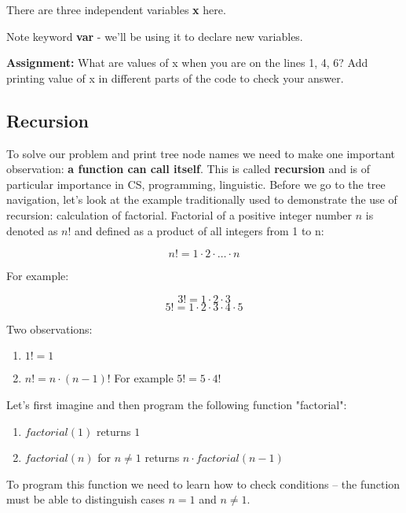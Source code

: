 There are three independent variables \textbf{x} here.

Note keyword \textbf{var} - we'll be using it to declare new variables.

\bigskip
\begin{tcolorbox}
\textbf{Assignment:}
What are values of x when you are on the lines 1, 4, 6?
Add printing value of x in different parts of the code
to check your answer.
\end{tcolorbox}

\subsection{Recursion}

To solve our problem and print tree node names we need
to make one important observation: \textbf{a function can call itself}.
This is called \textbf{recursion} and is of particular importance in
CS, programming, linguistic. Before we go to the tree navigation,
let's look at the example traditionally used to demonstrate
the use of recursion: calculation of factorial. Factorial of a
positive integer number $n$
is denoted as $n!$ and defined as a product of all integers
from 1 to n:

$$n! = 1 \cdot 2 \cdot\dots\cdot n$$

For example:

$$3! = 1\cdot 2\cdot 3$$
$$5! = 1\cdot 2\cdot 3\cdot 4\cdot 5$$

Two observations:

\begin{leftborder}
\begin{enumerate}
\item $1! = 1$
\item $n! = n\cdot (n-1)!$ For example $5! = 5\cdot 4!$
\end{enumerate}
\end{leftborder}

Let's first imagine and then program the following function "factorial":

\begin{leftborder}
\begin{enumerate}
\item $factorial(1)$ returns $1$
\item $factorial(n)$ for $n\neq 1$ returns $n\cdot factorial(n-1)$
\end{enumerate}
\end{leftborder}

To program this function we need to learn how to check conditions --
the function must be able to distinguish cases $n = 1$ and $n\neq 1$.

